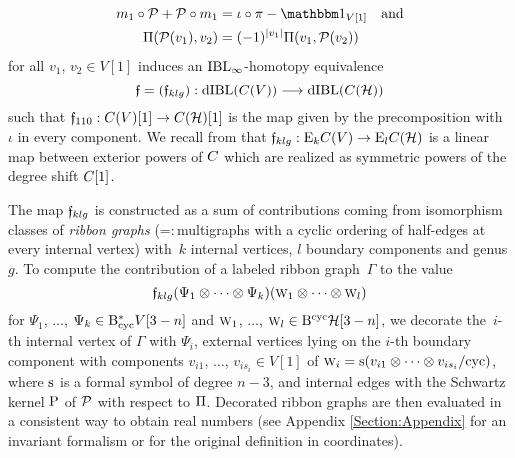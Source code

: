 \documentclass[\MainFolder/Text.tex]{subfiles}
\begin{document}
\begin{enumerate}[listparindent=\parindent,label=\textbf{(\Alph*)}]
\begin{equation}
\begin{aligned}
m_1 \circ \Htp + \Htp \circ m_1 &= \iota\circ \pi - \Id_{V[1]}\quad\text{and} \\ 
\Pair(\Htp(v_1),v_2) &= (-1)^{\Abs{v_1}}\Pair(v_1,\Htp(v_2)) 
\end{aligned}
\end{equation}
for all $v_1$, $v_2 \in V[1]$ induces an $\mathrm{IBL}_\infty$-homotopy equivalence 
\[\mathfrak{f}=(\mathfrak{f}_{klg}): \mathrm{dIBL}(C(V)) \longrightarrow \mathrm{dIBL}(C(\mathcal{H})) \]
such that $\mathfrak{f}_{110}: C(V)[1] \rightarrow C(\mathcal{H})[1]$ is the map given by the precomposition with~$\iota$ in every component.
We recall from \cite{Cieliebak2015} that $\mathfrak{f}_{klg}: \mathrm{E}_k C(V) \rightarrow \mathrm{E}_l C(\mathcal{H})$ is a linear map between exterior powers of $C$ which are realized as symmetric powers of the degree shift $C[1]$.
\end{enumerate}

The map $\mathfrak{f}_{klg}$ is constructed as a sum of contributions coming from isomorphism classes of \emph{ribbon graphs} (=:\,multigraphs with a cyclic ordering of half-edges at every internal vertex) with~$k$ internal vertices, $l$ boundary components and genus $g$.
To compute the contribution of a labeled ribbon graph~$\Gamma$ to the value 
\[ \mathfrak{f}_{klg}(\Psi_1\otimes \dotsb \otimes \Psi_k)(\text{\footnotesize W}_1 \otimes \dotsb\otimes \text{\footnotesize W}_l)\] 
for $\Psi_1$, $\dotsc$, $\Psi_k \in \mathrm{B}_{\mathrm{cyc}}^* V[3-n]$ and  $\text{\footnotesize W}_1$, $\dotsc$, $\text{\footnotesize W}_l\in \mathrm{B}^{\mathrm{cyc}} \mathcal{H} [3-n]$, we decorate the~$i$-th internal vertex of $\Gamma$ with $\Psi_i$, external vertices lying on the $i$-th boundary component with components $v_{i1}$, $\dotsc$, $v_{i s_i}\in V[1]$ of $\text{\footnotesize W}_i = \mathrm{s} (v_{i 1} \otimes \dotsb \otimes v_{i s_i} / \text{cyc})$, where $\mathrm{s}$ is a formal symbol of degree $n-3$, and internal edges with the Schwartz kernel $\mathrm{P}$ of $\mathcal{P}$ with respect to $\Pi$.
Decorated ribbon graphs are then evaluated in a consistent way to obtain real numbers (see Appendix \ref{Section:Appendix} for an invariant formalism or \cite[Section 10]{Cieliebak2015} for the original definition in coordinates).
\end{document}
